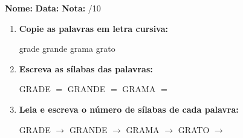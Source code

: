 \begin{exercicio}



\noindent\textbf{Nome:} \underline{\hspace{3.2cm}} \quad \textbf{Data:} \underline{\hspace{1.6cm}} \quad \textbf{Nota:} \underline{\hspace{0.9cm}}/10


\begin{enumerate}

  \item \textbf{Copie as palavras em letra cursiva:}
  \begin{center}
  grade \quad grande \quad grama \quad grato
  \end{center}
  \begin{center}
  \underline{\hspace{2.4cm}} \quad \underline{\hspace{2.4cm}} \quad \underline{\hspace{2.4cm}} \quad \underline{\hspace{2.4cm}}
  \end{center}

  \item \textbf{Escreva as sílabas das palavras:}
  \begin{center}
  GRADE $=$ \underline{\hspace{1.5cm}} \underline{\hspace{1.5cm}} \quad GRANDE $=$ \underline{\hspace{1.5cm}} \underline{\hspace{1.5cm}} \quad GRAMA $=$ \underline{\hspace{1.5cm}} \underline{\hspace{1.5cm}}
  \end{center}

  \item \textbf{Leia e escreva o número de sílabas de cada palavra:}
  \begin{center}
  GRADE $\rightarrow$ \underline{\hspace{0.9cm}} \quad GRANDE $\rightarrow$ \underline{\hspace{0.9cm}} \quad GRAMA $\rightarrow$ \underline{\hspace{0.9cm}} \quad GRATO $\rightarrow$ \underline{\hspace{0.9cm}}
  \end{center}


\end{enumerate}
\end{exercicio}
